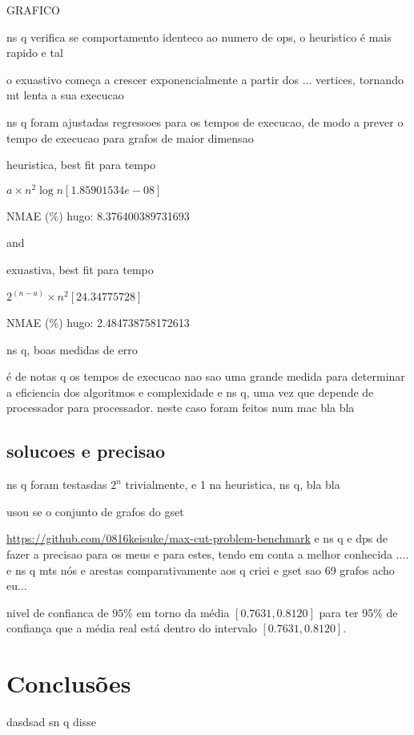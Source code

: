 \documentclass[mirror]{revdetua}
\begin{document}
GRAFICO

ns q verifica se comportamento identeco ao numero de ops, o heuristico é mais rapido e tal

o exuastivo começa a crescer exponencialmente a partir dos ... vertices, tornando mt lenta a sua execucao

ns q foram ajustadas regressoes para os tempos de execucao, de modo a prever o tempo de execucao para grafos de maior dimensao

heuristica, best fit para tempo

$a \times n^2 \log n [1.85901534e-08]$

NMAE (\%) hugo: 8.376400389731693

and

exuastiva, best fit para tempo

$2^{(n - a)} \times n^2 [24.34775728]$

NMAE (\%) hugo: 2.484738758172613

ns q, boas medidas de erro

é de notas q os tempos de execucao nao sao uma grande medida para determinar a eficiencia dos algoritmos e complexidade e ns q, uma vez que depende de processador para processador. neste caso foram feitos num mac bla bla


\subsection{solucoes e precisao}

ns q foram testasdas $2^n$ trivialmente, e 1 na heuristica, ns q, bla bla

usou se o conjunto de grafos do gset

\url{https://github.com/0816keisuke/max-cut-problem-benchmark} e ns q e dps de fazer a precisao para os meus e para estes, tendo em conta a melhor conhecida .... e ns q mts nós e arestas comparativamente aos q criei e gset sao 69 grafos acho eu...

nivel de confianca de $95\%$ em torno da média $[0.7631, 0.8120]$ para ter 95\% de confiança que a média real está dentro do intervalo $[0.7631, 0.8120]$.


\section{Conclusões}

dasdsad sn q disse


\end{document}
